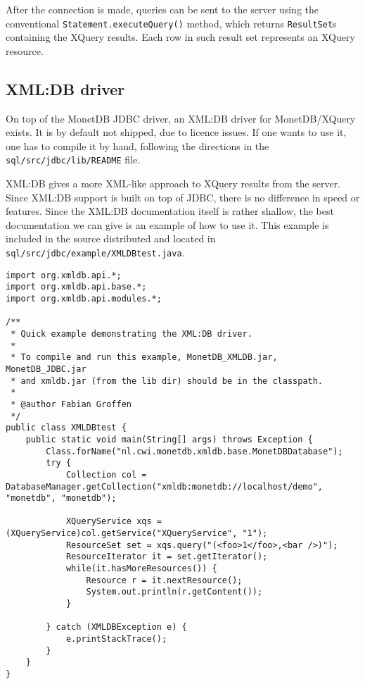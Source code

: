 \documentclass{article}
\begin{document}
After the connection is made, queries can be sent to the server using
the conventional \texttt{Statement.executeQuery()} method, which returns
\texttt{ResultSet}s containing the XQuery results.  Each row in such
result set represents an XQuery resource.

\subsection{XML:DB driver}
On top of the MonetDB JDBC driver, an XML:DB driver for MonetDB/XQuery
exists.  It is by default not shipped, due to licence issues.  If one
wants to use it, one has to compile it by hand, following the directions
in the \texttt{sql/src/jdbc/lib/README} file.

XML:DB gives a more XML-like approach to XQuery results from the server.
Since XML:DB support is built on top of JDBC, there is no difference in
speed or features.  Since the XML:DB documentation itself is rather
shallow, the best documentation we can give is an example of how to use
it.  This example is included in the source distributed and located in
\texttt{sql/src/jdbc/example/XMLDBtest.java}.

\begin{verbatim}
import org.xmldb.api.*;
import org.xmldb.api.base.*;
import org.xmldb.api.modules.*;

/**
 * Quick example demonstrating the XML:DB driver.
 *
 * To compile and run this example, MonetDB_XMLDB.jar, MonetDB_JDBC.jar
 * and xmldb.jar (from the lib dir) should be in the classpath.
 *
 * @author Fabian Groffen
 */
public class XMLDBtest {
    public static void main(String[] args) throws Exception {
        Class.forName("nl.cwi.monetdb.xmldb.base.MonetDBDatabase");
        try {
            Collection col = DatabaseManager.getCollection("xmldb:monetdb://localhost/demo", "monetdb", "monetdb"); 

            XQueryService xqs = (XQueryService)col.getService("XQueryService", "1");
            ResourceSet set = xqs.query("(<foo>1</foo>,<bar />)");
            ResourceIterator it = set.getIterator();
            while(it.hasMoreResources()) {
                Resource r = it.nextResource();
                System.out.println(r.getContent());
            }
            
        } catch (XMLDBException e) {
            e.printStackTrace();
        }
    }
}
\end{verbatim}
\end{document}
